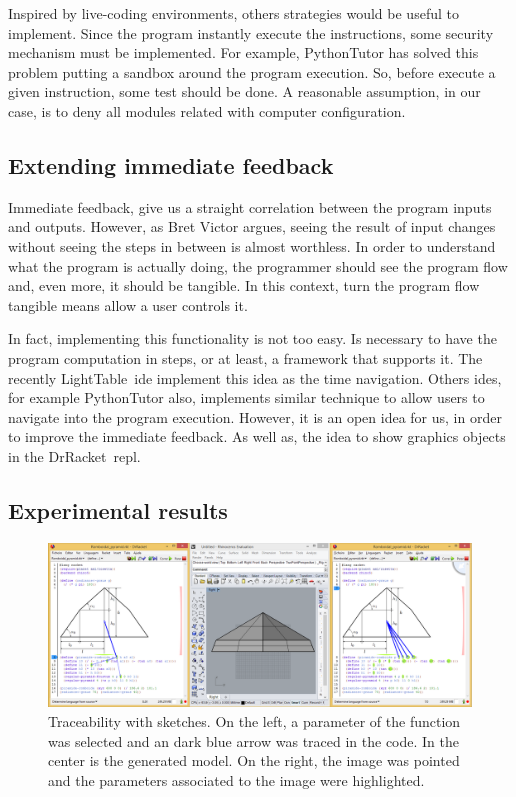 Inspired by live-coding environments, others strategies would be useful to implement. Since the program instantly execute the instructions, some security mechanism must be implemented. For example, PythonTutor has solved this problem putting a sandbox around the program execution. So, before execute a given instruction, some test should be done. A reasonable assumption, in our case, is to deny all modules related with computer configuration.

\subsection{Extending immediate feedback}

Immediate feedback, give us a straight correlation between the program inputs and outputs. However, as Bret Victor argues, seeing the result of input changes without seeing the steps in between is almost worthless. In order to understand what the program is actually doing, the programmer should see the program flow and, even more, it should be tangible. In this context, turn the program flow tangible means allow a user controls it.  

In fact, implementing this functionality is not too easy. Is necessary to have the program computation in steps, or at least, a framework that supports it. The recently LightTable~\ac{ide} implement this idea as the time navigation. Others \ac{ide}s, for example PythonTutor also, implements similar technique to allow users to navigate into the program execution. However, it is an open idea for us, in order to improve the immediate feedback. As well as, the idea to show graphics objects in the DrRacket~\ac{repl}.

\subsection{Experimental results}



\begin{figure}[!htbp]
  \centering
  \includegraphics[scale=0.26]{img/rosetta2}
    \caption{Traceability with sketches. On the left, a parameter of the function was selected and an dark blue arrow was traced in the code. In the center is the generated model. On the right, the image was pointed and the parameters associated to the image were highlighted.}
  \label{fig:trace}
\end{figure}